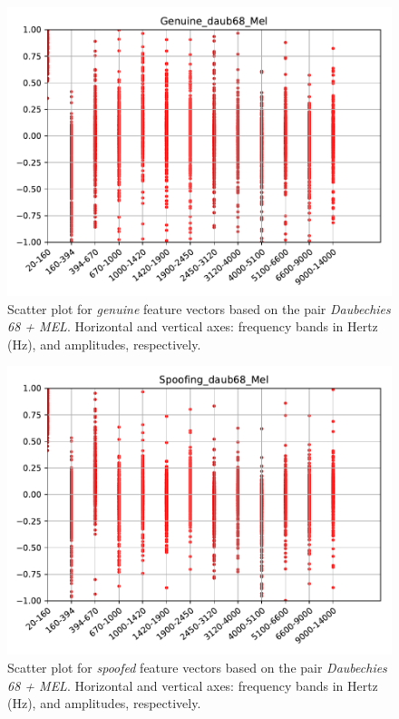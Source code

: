 		\begin{figure}[H]
			\centering
			\includegraphics[scale=.7]{images/results/barkVersusMel/Genuine_daub68_Mel.pdf}
			\caption{Scatter plot for \textit{genuine} feature vectors based on the pair \textit{Daubechies 68 + MEL}. Horizontal and vertical axes: frequency bands in Hertz (Hz), and amplitudes, respectively.}
			\label{fig:livedaub68mel}
		\end{figure}
		\begin{figure}[H]
			\centering
			\includegraphics[scale=.7]{images/results/barkVersusMel/Spoofing_daub68_Mel.pdf}
			\caption{Scatter plot for \textit{spoofed} feature vectors based on the pair \textit{Daubechies 68 + MEL}. Horizontal and vertical axes: frequency bands in Hertz (Hz), and amplitudes, respectively.}
			\label{fig:spoofingdaub68mel}
		\end{figure}
